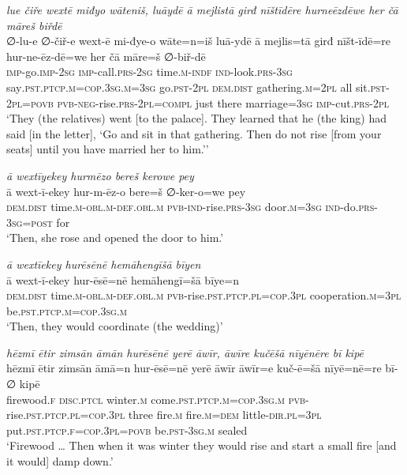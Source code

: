\ea \label{KŠ.87}
\textit{lue čiře wextē miđyo wāteniš, luāydē ā mejlistā girđ nīštīdēre hurneēzdēwe her čā māreš biřdē} \\ 
\gll ∅-lu-e ∅-čiř-e wext-ē mi-đye-o wāte=n=iš luā-ydē ā mejlis=tā girđ nīšt-īdē=re hur-ne-ēz-dē=we her čā māre=š ∅-biř-dē \\ 
 \textsc{imp-}go.\textsc{imp-}\textsc{2sg} \textsc{imp-}call\textsc{.prs}-\textsc{2sg} time\textsc{.m}\textsc{-indf} \textsc{ind-}look\textsc{.prs}\textsc{-3sg} say\textsc{.pst}\textsc{.ptcp}\textsc{.m}\textsc{=cop}\textsc{.3sg}\textsc{.m}\textsc{=3sg} go\textsc{.pst}-\textsc{2pl} \textsc{dem.dist} gathering\textsc{.m}=\textsc{2pl} all sit\textsc{.pst}-\textsc{2pl}\textsc{=\textsc{povb}} \textsc{pvb-}\textsc{neg-}rise\textsc{.prs}-\textsc{2pl}\textsc{=compl} just there marriage\textsc{=3sg} \textsc{imp-}cut\textsc{.prs}-\textsc{2pl} \\ 
\glt `They (the relatives) went [to the palace]. They learned that he (the king) had said [in the letter], ‘Go and sit in that gathering. Then do not rise [from your seats] until you have married her to him.’'
\z 
 
\ea \label{ŽH.75}
\textit{ā wextīyekey hurmēzo bereš kerowe pey} \\ 
\gll ā wext-ī-ekey hur-m-ēz-o bere=š ∅-ker-o=we pey \\ 
 \textsc{dem.dist} time\textsc{.m}\textsc{-obl}\textsc{.m}\textsc{-def}\textsc{.obl}\textsc{.m} \textsc{pvb-}\textsc{ind-}rise\textsc{.prs}\textsc{-3sg} door\textsc{.m}\textsc{=3sg} \textsc{ind-}do\textsc{.prs}\textsc{-3sg}\textsc{=\textsc{post}} for \\ 
\glt `Then, she rose and opened the door to him.'
\z 
 
\ea \label{RE.14}
\textit{ā wextīekey hurēsēnē hemāhengīšā bīyen} \\ 
\gll ā wext-ī-ekey hur-ēsē=nē hemāhengī=šā bīye=n \\ 
 \textsc{dem.dist} time\textsc{.m}\textsc{-obl}\textsc{.m}\textsc{-def}\textsc{.obl}\textsc{.m} \textsc{pvb-}rise\textsc{.pst}\textsc{.ptcp}\textsc{.pl}\textsc{=cop}\textsc{.3pl} cooperation\textsc{.m}\textsc{=3pl} be\textsc{.pst}\textsc{.ptcp}\textsc{.m}\textsc{=cop}\textsc{.3sg}\textsc{.m} \\ 
\glt `Then, they would coordinate (the wedding)'
\z 
 
\ea \label{ŽE.37}
\textit{hēzmī ētir zimsān āmān hurēsēnē yerē āwīr, āwīre kučēšā nīyēnēre bī kipē} \\ 
\gll hēzmī ētir zimsān āmā=n hur-ēsē=nē yerē āwīr āwīr=e kuč-ē=šā nīyē=nē=re bī-∅ kipē \\ 
 firewood\textsc{.f} \textsc{disc}.\textsc{ptcl} winter\textsc{.m} come\textsc{.pst}\textsc{.ptcp}\textsc{.m}\textsc{=cop}\textsc{.3sg}\textsc{.m} \textsc{pvb-}rise\textsc{.pst}\textsc{.ptcp}\textsc{.pl}\textsc{=cop}\textsc{.3pl} three fire\textsc{.m} fire\textsc{.m}\textsc{=dem} little\textsc{-dir}\textsc{.pl}\textsc{=3pl} put\textsc{.pst}\textsc{.ptcp}\textsc{.f}\textsc{=cop}\textsc{.3pl}\textsc{=\textsc{povb}} be\textsc{.pst}\textsc{-3sg}\textsc{.m} sealed \\ 
\glt `Firewood …  Then when it was winter they would rise and start a small fire [and it would] damp down.'
\z 
 
